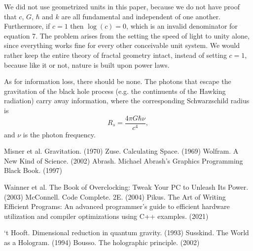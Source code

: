 \documentclass[12pt]{article}
\begin{document}
{We did not use geometrized units in this paper, because we do not have proof that $c$, $G$, $\hbar$ and $k$ are all fundamental and independent of one another. 
Furthermore, if $c = 1$ then $\log(c) = 0$, which is an invalid denominator for equation 7.
The problem arises from the setting the speed of light to unity alone, since everything works fine for every other conceivable unit system.
We would rather keep the entire theory of fractal geometry intact, instead of setting $c = 1$, because like it or not, nature is built upon power laws.

As for information loss, there should be none.
The photons that escape the gravitation of the black hole process (e.g. the continuents of the Hawking radiation) carry away information, where the corresponding Schwarzschild radius is
\begin{equation}
R_s = \frac{4 \pi G \hbar \nu}{c^4},
\end{equation}
and $\nu$ is the photon frequency.




\pagebreak





\begin{thebibliography}{9}
 Misner et al. Gravitation. (1970)
 Zuse. Calculating Space. (1969)
 Wolfram. A New Kind of Science. (2002)
 Abrash. Michael Abrash's Graphics Programming Black Book. (1997)

 Wainner et al. The Book of Overclocking: Tweak Your PC to Unleash Its Power. (2003)
 McConnell. Code Complete. 2E. (2004)
 Pikus. The Art of Writing Efficient Programs: An advanced programmer's guide to efficient hardware utilization and compiler optimizations using C++ examples. (2021)


 `t Hooft. Dimensional reduction in quantum gravity. (1993)
 Susskind. The World as a Hologram. (1994)
 Bousso. The holographic principle. (2002)


\end{thebibliography}}
\end{document}
